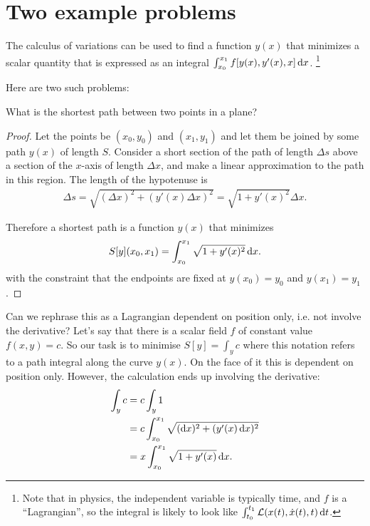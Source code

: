 
\section{Two example problems}
The calculus of variations can be used to find a function $y(x)$ that minimizes a scalar quantity that is
expressed as an integral $\int_{x_0}^{x_1} f[y(x), y'(x), x] \dx$. \footnote{Note that in physics, the
  independent variable is typically time, and $f$ is a ``Lagrangian'', so the integral is likely to look
  like $\int_{t_0}^{t_1} \Lag(x(t), \xdot(t), t) \dt$.}

Here are two such problems:

\begin{question*}
  What is the shortest path between two points in a plane?
\end{question*}

\begin{proof}
  Let the points be $(x_0, y_0)$ and $(x_1, y_1)$ and let them be joined by some path $y(x)$ of
  length $S$. Consider a short section of the path of length $\Delta s$ above a section of the $x$-axis of
  length $\Delta x$, and make a linear approximation to the path in this region. The length of the hypotenuse
  is
  \begin{align*}
    \Delta s = \sqrt{(\Delta x)^2 + (y'(x)\Delta x)^2} = \sqrt{1 + y'(x)^2} \Delta x.
  \end{align*}

  Therefore a shortest path is a function $y(x)$ that minimizes
  \begin{align*}
    S[y](x_0, x_1) = \int_{x_0}^{x_1} \sqrt{1 + y'(x)^2}\dx.
  \end{align*}
  with the constraint that the endpoints are fixed at $y(x_0) = y_0$ and $y(x_1) = y_1$.

\end{proof}


Can we rephrase  this as a Lagrangian  dependent on position only,  i.e. not involve the  derivative? Let's say
that   there  is   a  scalar   field  $f$   of  constant   value   $f(x,  y)   =  c$.   So  our   task  is   to
minimise $S[y] = \int_{y} c$ where this notation refers to  a path integral along the curve $y(x)$. On the face
of it this is dependent on position only. However, the calculation ends up involving the derivative:
\begin{align*}
  \int_{y} c
  &= c\int_{y}1 \\
  &= c\int_{x_{0}}^{x_{1}}\sqrt{(\dx)^{2} + (y'(x)\dx)^{2}} \\
  &= x\int_{x_0}^{x_1} \sqrt{1 + y'(x)} \dx.
\end{align*}


